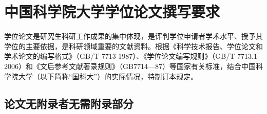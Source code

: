 \chapter{中国科学院大学学位论文撰写要求}

学位论文是研究生科研工作成果的集中体现，是评判学位申请者学术水平、授予其学位的主要依据，是科研领域重要的文献资料。根据《科学技术报告、学位论文和学术论文的编写格式》（GB/T 7713-1987）、《学位论文编写规则》（GB/T 7713.1-2006）和《文后参考文献著录规则》（GB7714—87）等国家有关标准，结合中国科学院大学（以下简称“国科大”）的实际情况，特制订本规定。

\section{论文无附录者无需附录部分}

